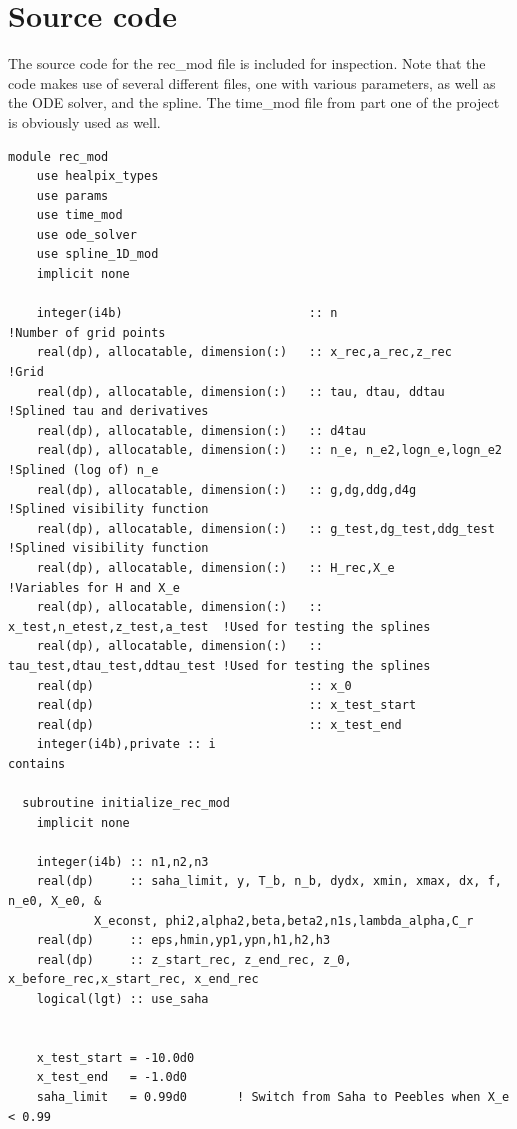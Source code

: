 \documentclass{aa}   %
\begin{document}
\onecolumn 
\section{Source code}\label{sec:files}
The source code for the rec\_mod file is included for inspection. Note that the code makes use of several different files, one with various parameters, as well as the ODE solver, and the spline. The time\_mod file from part one of the project is obviously used as well.

\begin{verbatim}
module rec_mod
    use healpix_types
    use params
    use time_mod
    use ode_solver
    use spline_1D_mod
    implicit none

    integer(i4b)                          :: n                             !Number of grid points
    real(dp), allocatable, dimension(:)   :: x_rec,a_rec,z_rec             !Grid
    real(dp), allocatable, dimension(:)   :: tau, dtau, ddtau              !Splined tau and derivatives
    real(dp), allocatable, dimension(:)   :: d4tau
    real(dp), allocatable, dimension(:)   :: n_e, n_e2,logn_e,logn_e2      !Splined (log of) n_e
    real(dp), allocatable, dimension(:)   :: g,dg,ddg,d4g                  !Splined visibility function
    real(dp), allocatable, dimension(:)   :: g_test,dg_test,ddg_test       !Splined visibility function
    real(dp), allocatable, dimension(:)   :: H_rec,X_e                     !Variables for H and X_e
    real(dp), allocatable, dimension(:)   :: x_test,n_etest,z_test,a_test  !Used for testing the splines
    real(dp), allocatable, dimension(:)   :: tau_test,dtau_test,ddtau_test !Used for testing the splines
    real(dp)                              :: x_0
    real(dp)                              :: x_test_start
    real(dp)                              :: x_test_end
    integer(i4b),private :: i
contains

  subroutine initialize_rec_mod
    implicit none
    
    integer(i4b) :: n1,n2,n3
    real(dp)     :: saha_limit, y, T_b, n_b, dydx, xmin, xmax, dx, f, n_e0, X_e0, &
		    X_econst, phi2,alpha2,beta,beta2,n1s,lambda_alpha,C_r
    real(dp)     :: eps,hmin,yp1,ypn,h1,h2,h3
    real(dp)     :: z_start_rec, z_end_rec, z_0, x_before_rec,x_start_rec, x_end_rec
    logical(lgt) :: use_saha


    x_test_start = -10.0d0
    x_test_end   = -1.0d0
    saha_limit   = 0.99d0       ! Switch from Saha to Peebles when X_e < 0.99


\end{verbatim}
\end{document}
